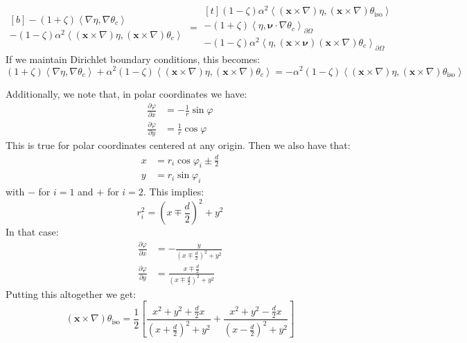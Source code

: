 \documentclass[reqno]{article}
\begin{document}
\begin{equation}
    \begin{multlined}[b]
    -(1 + \zeta) \left<\nabla \eta, \nabla \theta_c \right> \\
    - (1 - \zeta) \alpha^2 \left< \left(\mathbf{x} \times \nabla \right) \eta, \left(\mathbf{x} \times \nabla \right) \theta_c \right>
    \end{multlined}
    =
    \begin{multlined}[t]
    (1 - \zeta) \alpha^2 \left< \left(\mathbf{x} \times \nabla \right)\eta, \left(\mathbf{x} \times \nabla \right) \theta_\text{iso} \right> \\
        - (1 + \zeta) \left<\eta, \boldsymbol{\nu} \cdot \nabla \theta_c \right>_{\partial \Omega} \\
        - (1 - \zeta) \alpha^2 \left< \eta, \left(\mathbf{x} \times \boldsymbol{\nu} \right) \left(\mathbf{x} \times \nabla \right) \theta_c \right>_{\partial \Omega}
    \end{multlined}
\end{equation}
If we maintain Dirichlet boundary conditions, this becomes:
\begin{equation}
    (1 + \zeta) \left<\nabla \eta, \nabla \theta_c \right>
    + \alpha^2 (1 - \zeta) \left< \left(\mathbf{x} \times \nabla \right) \eta, \left(\mathbf{x} \times \nabla \right) \theta_c \right>
    =
    - \alpha^2 (1 - \zeta) \left< \left(\mathbf{x} \times \nabla \right)\eta, \left(\mathbf{x} \times \nabla \right) \theta_\text{iso} \right> 
\end{equation}

Additionally, we note that, in polar coordinates we have:
\begin{align}
    \frac{\partial \varphi}{\partial x}
    &=
    -\frac{1}{r} \sin \varphi \\
    \frac{\partial \varphi}{\partial y}
    &=
    \frac{1}{r} \cos\varphi
\end{align}
This is true for polar coordinates centered at any origin.
Then we also have that:
\begin{align}
    x &= r_i \cos \varphi_i \pm \frac{d}{2} \\
    y &= r_i \sin \varphi_i
\end{align}
with $-$ for $i = 1$ and $+$ for $i = 2$.
This implies:
\begin{equation}
    r_i^2
    =
    \left( x \mp \frac{d}{2} \right)^2 + y^2
\end{equation}
In that case:
\begin{align}
    \frac{\partial \varphi}{\partial x}
    &=
    -\frac{y}{(x \mp \frac{d}{2})^2 + y^2} \\
    \frac{\partial \varphi}{\partial y}
    &=
    \frac{x \mp \frac{d}{2}}{(x \mp \frac{d}{2})^2 + y^2}
\end{align}
Putting this altogether we get:
\begin{equation}
    (\mathbf x \times \nabla ) \theta_\text{iso}
    =
    \frac12 \left[
        \frac{x^2 + y^2 + \frac{d}{2} x}{\left(x + \frac{d}{2} \right)^2 + y^2}
        + \frac{x^2 + y^2 - \frac{d}{2} x}{\left(x - \frac{d}{2} \right)^2 + y^2}
    \right]
\end{equation}
\end{document}
